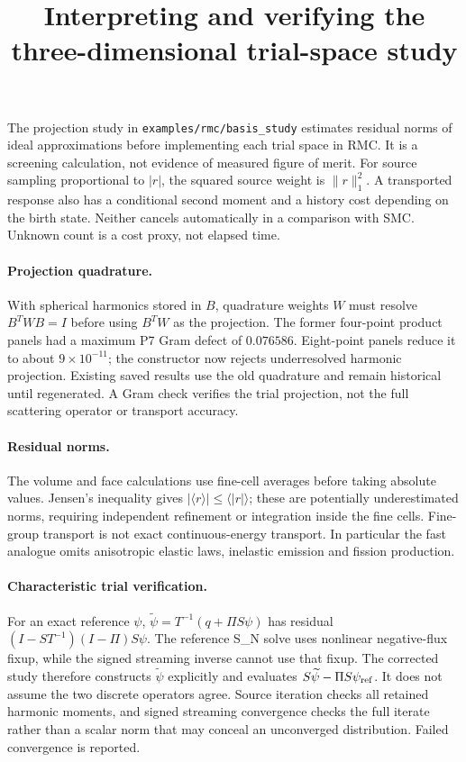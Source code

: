 \documentclass[11pt]{article}
\title{Interpreting and verifying the three-dimensional trial-space study}
\date{}
\begin{document}
\maketitle
The projection study in \texttt{examples/rmc/basis\_study} estimates residual
norms of ideal approximations before implementing each trial space in RMC.
It is a screening calculation, not evidence of measured figure of merit.
For source sampling proportional to $|r|$, the squared source weight is
$\|r\|_1^2$. A transported response also has a conditional second moment and a
history cost depending on the birth state. Neither cancels automatically in a
comparison with SMC. Unknown count is a cost proxy, not elapsed time.

\paragraph{Projection quadrature.}
With spherical harmonics stored in $B$, quadrature weights $W$ must resolve
$B^TWB=I$ before using $B^TW$ as the projection. The former four-point product
panels had a maximum P7 Gram defect of $0.076586$. Eight-point panels reduce it
to about $9\times10^{-11}$; the constructor now rejects underresolved harmonic
projection. Existing saved results use the old quadrature and remain historical
until regenerated. A Gram check verifies the trial projection, not the full
scattering operator or transport accuracy.

\paragraph{Residual norms.}
The volume and face calculations use fine-cell averages before taking absolute
values. Jensen's inequality gives $|\langle r\rangle|\le\langle|r|\rangle$;
these are potentially underestimated norms, requiring independent refinement
or integration inside the fine cells. Fine-group transport is not exact
continuous-energy transport. In particular the fast analogue omits anisotropic
elastic laws, inelastic emission and fission production.

\paragraph{Characteristic trial verification.}
For an exact reference $\psi$, $\widetilde\psi=T^{-1}(q+\Pi S\psi)$ has residual
$(I-ST^{-1})(I-\Pi)S\psi$. The reference S\_N solve uses nonlinear negative-flux
fixup, while the signed streaming inverse cannot use that fixup. The corrected
study therefore constructs $\widetilde\psi$ explicitly and evaluates
$S\widetilde\psi-\Pi S\psi_{\rm ref}$. It does not assume the two discrete
operators agree. Source iteration checks all retained harmonic moments, and
signed streaming convergence checks the full iterate rather than a scalar norm
that may conceal an unconverged distribution. Failed convergence is reported.
\end{document}
